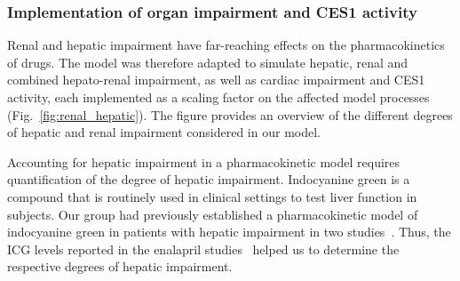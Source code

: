 \documentclass[pharmaceutics,article,submit,pdftex,moreauthors]{Definitions/mdpi}
\begin{document}
\subsubsection{Implementation of organ impairment and CES1 activity}

Renal and hepatic impairment have far-reaching effects on the pharmacokinetics of drugs. The model was therefore adapted to simulate hepatic, renal and combined hepato-renal impairment, as well as cardiac impairment and CES1 activity, each implemented as a scaling factor on the affected model processes (Fig.~\ref{fig:renal_hepatic}). The figure provides an overview of the different degrees of hepatic and renal impairment considered in our model. 

Accounting for hepatic impairment in a pharmacokinetic model requires quantification of the degree of hepatic impairment. Indocyanine green is a compound that is routinely used in clinical settings to test liver function in subjects. Our group had previously established a pharmacokinetic model of indocyanine green in patients with hepatic impairment in two studies~\cite{Koller2021, Koller2021a}. Thus, the ICG levels reported in the enalapril studies~\cite{Baba1989, Ohnishi1989} helped us to determine the respective degrees of hepatic impairment.
\end{document}
